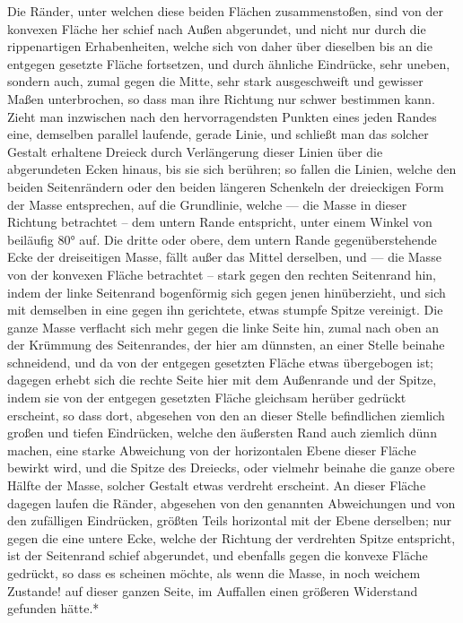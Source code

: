 \documentclass[a4paper, 11pt, oneside, german]{article}
\begin{document}
Die Ränder, unter welchen diese beiden Flächen zusammenstoßen, sind von der konvexen Fläche her schief nach Außen abgerundet, und nicht nur durch die rippenartigen Erhabenheiten, welche sich von daher über dieselben bis an die entgegen gesetzte Fläche fortsetzen, und durch ähnliche Eindrücke, sehr uneben, sondern auch, zumal gegen die Mitte, sehr stark ausgeschweift und gewisser Maßen unterbrochen, so dass man ihre Richtung nur schwer bestimmen kann. Zieht man inzwischen nach den hervorragendsten Punkten eines jeden Randes eine, demselben parallel laufende, gerade Linie, und schließt man das solcher Gestalt erhaltene Dreieck durch Verlängerung dieser Linien über die abgerundeten Ecken hinaus, bis sie sich berühren; so fallen die Linien, welche den beiden Seitenrändern oder den beiden längeren Schenkeln der dreieckigen Form der Masse entsprechen, auf die Grundlinie, welche --- die Masse in dieser Richtung betrachtet -- dem untern Rande entspricht, unter einem Winkel von beiläufig 80° auf. Die dritte oder obere, dem untern Rande gegenüberstehende Ecke der dreiseitigen Masse, fällt außer das Mittel derselben, und --- die Masse von der konvexen Fläche betrachtet -- stark gegen den rechten Seitenrand hin, indem der linke Seitenrand bogenförmig sich gegen jenen hinüberzieht, und sich mit demselben in eine gegen ihn gerichtete, etwas stumpfe Spitze vereinigt. Die ganze Masse verflacht sich mehr gegen die linke Seite hin, zumal nach oben an der Krümmung des Seitenrandes, der hier am dünnsten, an einer Stelle beinahe schneidend, und da von der entgegen gesetzten Fläche etwas übergebogen ist; dagegen erhebt sich die rechte Seite hier mit dem Außenrande und der Spitze, indem sie von der entgegen gesetzten Fläche gleichsam herüber gedrückt erscheint, so dass dort, abgesehen von den an dieser Stelle befindlichen ziemlich großen und tiefen Eindrücken, welche den äußersten Rand auch ziemlich dünn machen, eine starke Abweichung von der horizontalen Ebene dieser Fläche bewirkt wird, und die Spitze des Dreiecks, oder vielmehr beinahe die ganze obere Hälfte der Masse, solcher Gestalt etwas verdreht erscheint. An dieser Fläche dagegen laufen die Ränder, abgesehen von den genannten Abweichungen und von den zufälligen Eindrücken, größten Teils horizontal mit der Ebene derselben; nur gegen die eine untere Ecke, welche der Richtung der verdrehten Spitze entspricht, ist der Seitenrand schief abgerundet, und ebenfalls gegen die konvexe Fläche gedrückt, so dass es scheinen möchte, als wenn die Masse, in noch weichem Zustande! auf dieser ganzen Seite, im Auffallen einen größeren Widerstand gefunden hätte.*
\end{document}
